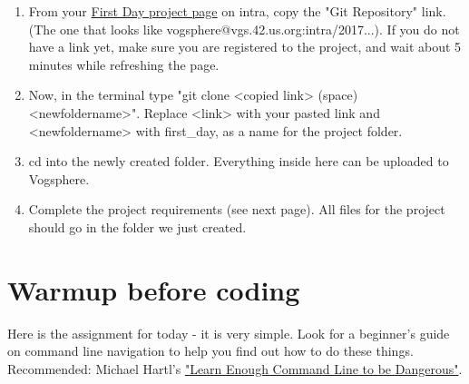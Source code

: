 \documentclass{42-en}
\begin{document}
\begin{enumerate}

\item From your \href{https://projects.intra.42.fr/h2s-first-day/mine}{First Day project page} on intra, copy the "Git Repository" link. (The one that looks like vogsphere@vgs.42.us.org:intra/2017...). If you do not have a link yet, make sure you are registered to the project, and wait about 5 minutes while refreshing the page.

\item Now, in the terminal type "git clone <copied link> (space) <newfoldername>". Replace <link> with your pasted link and <newfoldername> with first\_day, as a name for the project folder.

\item cd into the newly created folder. Everything inside here can be uploaded to Vogsphere.

\item Complete the project requirements (see next page). All files for the project should go in the folder we just created.

\end{enumerate}



\chapter{Warmup before coding}

\makeheaderfiles

Here is the assignment for today - it is very simple. Look for a beginner's guide on command line navigation to help you find out how to do these things. Recommended: Michael Hartl's \href{https://www.learnenough.com/command-line-tutorial}{"Learn Enough Command Line to be Dangerous"}.
\end{document}
